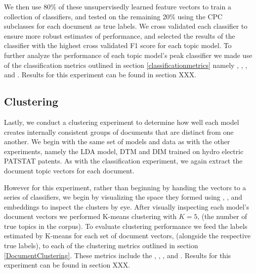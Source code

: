 We then use 80$\%$ of these unsupervisedly learned feature vectors to train a collection of classifiers, and tested on the remaining 20$\%$ using the CPC subclasses for each document as true labels. We cross validated each classifier to ensure more robust estimates of performance, and selected the results of the classifier with the highest cross validated F1 score for each topic model. To further analyze the performance of each topic model's peak classifier we made use of the classification metrics outlined in section \ref{classificationmetrics} namely , , , and . Results for this experiment can be found in section XXX.


\subsection{Clustering}
Lastly, we conduct a clustering experiment to determine how well each model creates internally consistent groups of documents that are distinct from one another. We begin with the same set of models and data as with the other experiments, namely the LDA model, DTM and DIM trained on hydro electric PATSTAT patents. As with the classification experiment, we again extract the document topic vectors for each document.

However for this experiment, rather than beginning by handing the vectors to a series of classifiers, we begin by visualizing the space they formed using , , and  embeddings to inspect the clusters by eye. After visually inspecting each model's document vectors we performed K-means clustering with $K=5$, (the number of true topics in the corpus). To evaluate clustering performance we feed the labels estimated by K-means for each set of document vectors, (alongside the respective true labels), to each of the clustering metrics outlined in section \ref{DocumentClustering}. These metrics include the , , ,  and . Results for this experiment can be found in section XXX.

